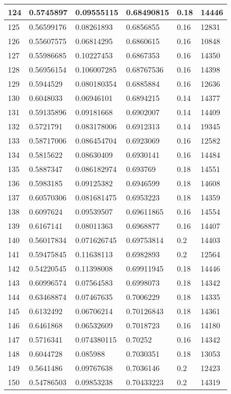 \begin{longtable}{|l|l|l|l|l|l|}
124 & 0.5745897 & 0.09555115 & 0.68490815 & 0.18 & 14446 \\ \hline 
125 & 0.56599176 & 0.08261893 & 0.6856855 & 0.16 & 12831 \\ \hline 
126 & 0.55607575 & 0.06814295 & 0.6860615 & 0.16 & 10848 \\ \hline 
127 & 0.55986685 & 0.10227453 & 0.6867353 & 0.16 & 14350 \\ \hline 
128 & 0.56956154 & 0.106007285 & 0.68767536 & 0.16 & 14398 \\ \hline 
129 & 0.5944529 & 0.080180354 & 0.6885884 & 0.16 & 12636 \\ \hline 
130 & 0.6048033 & 0.06946101 & 0.6894215 & 0.14 & 14377 \\ \hline 
131 & 0.59135896 & 0.09181668 & 0.6902007 & 0.14 & 14409 \\ \hline 
132 & 0.5721791 & 0.083178006 & 0.6912313 & 0.14 & 19345 \\ \hline 
133 & 0.58717006 & 0.086454704 & 0.6923069 & 0.16 & 12582 \\ \hline 
134 & 0.5815622 & 0.08630409 & 0.6930141 & 0.16 & 14484 \\ \hline 
135 & 0.5887347 & 0.086182974 & 0.693769 & 0.18 & 14551 \\ \hline 
136 & 0.5983185 & 0.09125382 & 0.6946599 & 0.18 & 14608 \\ \hline 
137 & 0.60570306 & 0.081681475 & 0.6953223 & 0.18 & 14359 \\ \hline 
138 & 0.6097624 & 0.09539507 & 0.69611865 & 0.16 & 14554 \\ \hline 
139 & 0.6167141 & 0.08011363 & 0.6968877 & 0.16 & 14407 \\ \hline 
140 & 0.56017834 & 0.071626745 & 0.69753814 & 0.2 & 14403 \\ \hline 
141 & 0.59475845 & 0.11638113 & 0.6982893 & 0.2 & 12564 \\ \hline 
142 & 0.54220545 & 0.11398008 & 0.69911945 & 0.18 & 14446 \\ \hline 
143 & 0.60996574 & 0.07564583 & 0.6998073 & 0.18 & 14342 \\ \hline 
144 & 0.63468874 & 0.07467635 & 0.7006229 & 0.18 & 14335 \\ \hline 
145 & 0.6132492 & 0.06706214 & 0.70126843 & 0.18 & 14361 \\ \hline 
146 & 0.6461868 & 0.06532609 & 0.7018723 & 0.16 & 14180 \\ \hline 
147 & 0.5716341 & 0.074380115 & 0.70252 & 0.16 & 14342 \\ \hline 
148 & 0.6044728 & 0.085988 & 0.7030351 & 0.18 & 13053 \\ \hline 
149 & 0.5641486 & 0.09767638 & 0.7036146 & 0.2 & 12423 \\ \hline 
150 & 0.54786503 & 0.09853238 & 0.70433223 & 0.2 & 14319 \\ \hline 
\end{longtable}